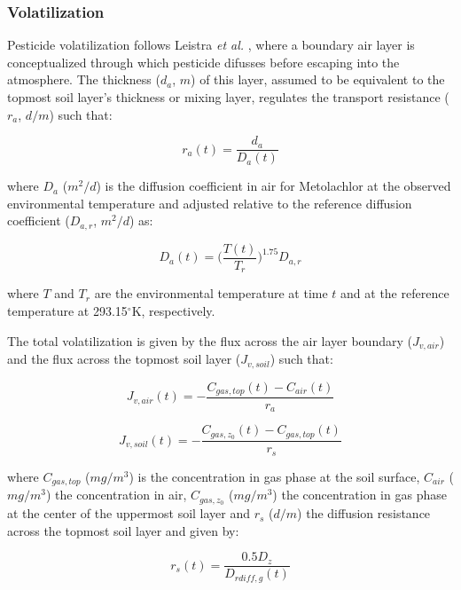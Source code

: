 \documentclass[]{article}
\begin{document}
\subsubsection{Volatilization}\label{volatilization}

Pesticide volatilization follows Leistra \textit{et al.}
\citeyearpar{Leistra2001}, where a boundary air layer is conceptualized
through which pesticide difusses before escaping into the atmosphere.
The thickness (\(d_a\), \(m\)) of this layer, assumed to be equivalent
to the topmost soil layer's thickness or mixing layer, regulates the
transport resistance (\(r_a\), \(d/m\)) such that:

\begin{equation}
r_a(t) = \frac{ d_a }{ D_a(t) }
\label{eq:resistance_air}
\end{equation}

where \(D_a\) (\(m^2/d\)) is the diffusion coefficient in air for
Metolachlor at the observed environmental temperature and adjusted
relative to the reference diffusion coefficient (\(D_{a,r}\), \(m^2/d\))
as:

\begin{equation}
D_a(t) = \Big(\frac{ T(t) }{ T_r } \Big)^{1.75} D_{a,r}
\label{eq:Da}
\end{equation}

where \(T\) and \(T_r\) are the environmental temperature at time \(t\)
and at the reference temperature at 293.15\(^\circ\)K, respectively.

The total volatilization is given by the flux across the air layer
boundary (\(J_{v,air}\)) and the flux across the topmost soil layer
(\(J_{v,soil}\)) such that:

\begin{equation}
J_{v,air}(t) = - \frac{ C_{gas,top}(t) - C_{air}(t) }{ r_a }
\label{eq:Jva}
\end{equation}

\begin{equation}
J_{v,soil}(t) = - \frac{ C_{gas,z_0}(t) - C_{gas,top}(t) }{ r_s }
\label{eq:Jvs}
\end{equation}

where \(C_{gas,top}\) (\(mg/m^3\)) is the concentration in gas phase at
the soil surface, \(C_{air}\) (\(mg/m^3\)) the concentration in air,
\(C_{gas,z_0}\) (\(mg/m^3\)) the concentration in gas phase at the
center of the uppermost soil layer and \(r_s\) (\(d/m\)) the diffusion
resistance across the topmost soil layer and given by:

\begin{equation}
r_s(t)= \frac{ 0.5 D_z }{ D_{rdiff,g}(t) }
\label{eq:resistance_soil}
\end{equation}
\end{document}
